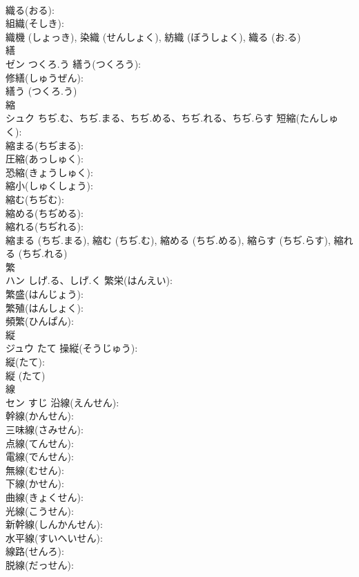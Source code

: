 \documentclass[8pt]{extreport}
\begin{document}
\begin{CJK}{UTF8}{min}
\\	織る(おる): 
\\	組織(そしき): 
\\	織機 (しょっき), 染織 (せんしょく), 紡織 (ぼうしょく), 織る (お.る)
\\	繕			
\\	ゼン	つくろ.う	繕う(つくろう): 
\\	修繕(しゅうぜん): 
\\	繕う (つくろ.う)
\\	縮			
\\	シュク	ちぢ.む、ちぢ.まる、ちぢ.める、ちぢ.れる、ちぢ.らす	短縮(たんしゅく): 
\\	縮まる(ちぢまる): 
\\	圧縮(あっしゅく): 
\\	恐縮(きょうしゅく): 
\\	縮小(しゅくしょう): 
\\	縮む(ちぢむ): 
\\	縮める(ちぢめる): 
\\	縮れる(ちぢれる): 
\\	縮まる (ちぢ.まる), 縮む (ちぢ.む), 縮める (ちぢ.める), 縮らす (ちぢ.らす), 縮れる (ちぢ.れる)
\\	繁			
\\	ハン	しげ.る、しげ.く	繁栄(はんえい): 
\\	繁盛(はんじょう): 
\\	繁殖(はんしょく): 
\\	頻繁(ひんぱん): 
\\	縦			
\\	ジュウ	たて	操縦(そうじゅう): 
\\	縦(たて): 
\\	縦 (たて)
\\	線		
\\	セン	すじ	沿線(えんせん): 
\\	幹線(かんせん): 
\\	三味線(さみせん): 
\\	点線(てんせん): 
\\	電線(でんせん): 
\\	無線(むせん): 
\\	下線(かせん): 
\\	曲線(きょくせん): 
\\	光線(こうせん): 
\\	新幹線(しんかんせん): 
\\	水平線(すいへいせん): 
\\	線路(せんろ): 
\\	脱線(だっせん): 

\end{CJK}
\end{document}
